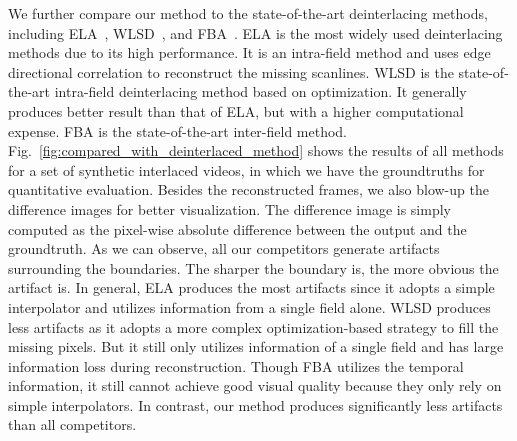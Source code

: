 We further compare our method to the state-of-the-art deinterlacing methods,
including ELA~\cite{doyle1990interlaced}, WLSD~\cite{wang2014interlacing}, and
FBA~\cite{vedadi2013interlacing}. ELA is the most widely used deinterlacing
methods due to its high performance. It is an intra-field method and uses edge
directional correlation to reconstruct the missing scanlines. WLSD is the state-of-the-art intra-field deinterlacing method based on optimization. It generally
produces better result than that of ELA, but with a higher computational
expense. FBA is the state-of-the-art inter-field method.
Fig.~\ref{fig:compared_with_deinterlaced_method} shows the results of all
methods for a set of synthetic interlaced videos, in which we have the
groundtruths for quantitative evaluation. Besides the reconstructed frames, we
also blow-up the difference images for better visualization. The difference
image is simply computed as the pixel-wise absolute difference between the
output and the groundtruth. As we can observe, all our competitors
generate artifacts surrounding the boundaries. The sharper the boundary is, the more
obvious the artifact is. In general, ELA produces the most artifacts since it
adopts a simple interpolator and utilizes information from a single field alone. 
WLSD produces less artifacts as it adopts a more complex optimization-based strategy to fill the missing pixels. But it still
only utilizes information of a single field and has large information loss
during reconstruction. Though FBA utilizes the temporal information, 
it still cannot achieve good visual quality because
they only rely on simple interpolators. In contrast, our method produces
significantly less artifacts than all competitors.


